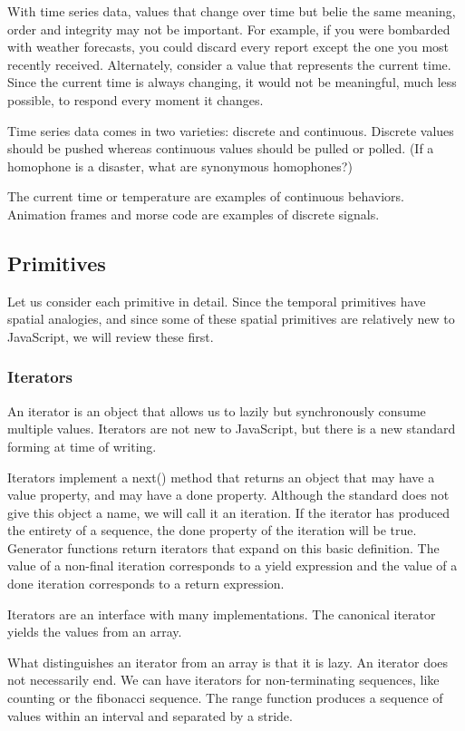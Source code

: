 With time series data, values that change over time but belie the same meaning, order and integrity may not be important. For example, if you were bombarded with weather forecasts, you could discard every report except the one you most recently received. Alternately, consider a value that represents the current time. Since the current time is always changing, it would not be meaningful, much less possible, to respond every moment it changes.

Time series data comes in two varieties: discrete and continuous. Discrete values should be pushed whereas continuous values should be pulled or polled. (If a homophone is a disaster, what are synonymous homophones?)

The current time or temperature are examples of continuous behaviors. Animation frames and morse code are examples of discrete signals.

\subsection{Primitives}

Let us consider each primitive in detail. Since the temporal primitives have spatial analogies, and since some of these spatial primitives are relatively new to JavaScript, we will review these first.

\subsubsection{Iterators}

An iterator is an object that allows us to lazily but synchronously consume multiple values. Iterators are not new to JavaScript, but there is a new standard forming at time of writing.

Iterators implement a next() method that returns an object that may have a value property, and may have a done property. Although the standard does not give this object a name, we will call it an iteration. If the iterator has produced the entirety of a sequence, the done property of the iteration will be true. Generator functions return iterators that expand on this basic definition. The value of a non-final iteration corresponds to a yield expression and the value of a done iteration corresponds to a return expression.

Iterators are an interface with many implementations. The canonical iterator yields the values from an array.

What distinguishes an iterator from an array is that it is lazy. An iterator does not necessarily end. We can have iterators for non-terminating sequences, like counting or the fibonacci sequence. The range function produces a sequence of values within an interval and separated by a stride.

